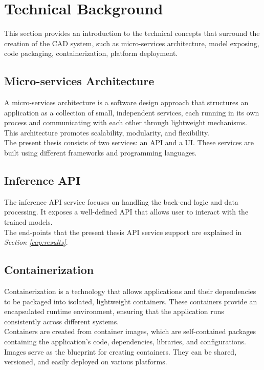 \newpage

\section{Technical Background}

This section provides an introduction to the technical concepts
that surround the creation of the CAD system, such as micro-services architecture, model exposing, code packaging, containerization, platform deployment.

\subsection{Micro-services Architecture}

A micro-services architecture is a software design approach that structures an application as a collection of small, independent services, each running in its own process and communicating with each other through lightweight mechanisms. This architecture promotes scalability, modularity, and flexibility. \\

The present thesis consists of two services: an API and a UI. These services are built using different frameworks and programming languages.


\subsection{Inference API}

The inference API service focuses on handling the back-end logic and data processing.
It exposes a well-defined API that allows user to interact with the trained models. \\

The end-points that the present thesis API service support are explained in \textit{Section \ref{cap:results}}.

\subsection{Containerization}

Containerization is a technology that allows applications and their dependencies to be packaged into isolated, lightweight containers. These containers provide an encapsulated runtime environment, ensuring that the application runs consistently across different systems. \\

Containers are created from container images, which are self-contained packages containing the application's code, dependencies, libraries, and configurations. Images serve as the blueprint for creating containers. They can be shared, versioned, and easily deployed on various platforms. \\

